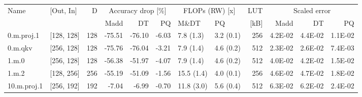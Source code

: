 \begin{table}
\centering
\begin{tabular}{llrrrrllrrrr}
\toprule
Name & [Out, In] & D & \multicolumn{3}{|c|}{Accuracy drop [\%]} & \multicolumn{2}{|c|}{FLOPs (RW) [x]} & LUT & \multicolumn{3}{|c|}{Scaled error} \\
 &  &  & Madd & DT & PQ & M\&DT & PQ & [kB] & Madd & DT & PQ \\
\midrule
0.m.proj.1 & [128, 128] & 128 & {\cellcolor[HTML]{A70226}} \color[HTML]{F1F1F1} -75.51 & {\cellcolor[HTML]{A50026}} \color[HTML]{F1F1F1} -76.10 & {\cellcolor[HTML]{FAFDB8}} \color[HTML]{000000} -6.03 & 7.8 (1.3) & 3.2 (0.1) & 256 & {\cellcolor[HTML]{ECF7A6}} \color[HTML]{000000} 4.2E-02 & {\cellcolor[HTML]{EFF8AA}} \color[HTML]{000000} 4.4E-02 & {\cellcolor[HTML]{BFE47A}} \color[HTML]{000000} 1.1E-02 \\
0.m.qkv & [256, 128] & 128 & {\cellcolor[HTML]{A70226}} \color[HTML]{F1F1F1} -75.76 & {\cellcolor[HTML]{A50026}} \color[HTML]{F1F1F1} -76.04 & {\cellcolor[HTML]{F2FAAE}} \color[HTML]{000000} -3.21 & 7.9 (1.4) & 4.6 (0.2) & 512 & {\cellcolor[HTML]{D3EC87}} \color[HTML]{000000} 2.3E-02 & {\cellcolor[HTML]{D7EE8A}} \color[HTML]{000000} 2.6E-02 & {\cellcolor[HTML]{B9E176}} \color[HTML]{000000} 7.4E-03 \\
1.m.0 & [256, 128] & 128 & {\cellcolor[HTML]{E44C34}} \color[HTML]{F1F1F1} -56.38 & {\cellcolor[HTML]{ED5F3C}} \color[HTML]{F1F1F1} -51.97 & {\cellcolor[HTML]{F5FBB2}} \color[HTML]{000000} -4.07 & 7.9 (1.4) & 4.6 (0.2) & 512 & {\cellcolor[HTML]{EBF7A3}} \color[HTML]{000000} 4.0E-02 & {\cellcolor[HTML]{EEF8A8}} \color[HTML]{000000} 4.2E-02 & {\cellcolor[HTML]{C5E67E}} \color[HTML]{000000} 1.5E-02 \\
1.m.2 & [128, 256] & 256 & {\cellcolor[HTML]{E65036}} \color[HTML]{F1F1F1} -55.19 & {\cellcolor[HTML]{EF633F}} \color[HTML]{F1F1F1} -51.09 & {\cellcolor[HTML]{EEF8A8}} \color[HTML]{000000} -1.56 & 15.5 (1.4) & 4.0 (0.1) & 256 & {\cellcolor[HTML]{F2FAAE}} \color[HTML]{000000} 4.6E-02 & {\cellcolor[HTML]{F4FAB0}} \color[HTML]{000000} 4.7E-02 & {\cellcolor[HTML]{CBE982}} \color[HTML]{000000} 1.8E-02 \\
10.m.proj.1 & [256, 192] & 192 & {\cellcolor[HTML]{FDFEBC}} \color[HTML]{000000} -7.04 & {\cellcolor[HTML]{FDFEBC}} \color[HTML]{000000} -6.99 & {\cellcolor[HTML]{EBF7A3}} \color[HTML]{000000} -0.70 & 11.8 (3.0) & 5.6 (0.4) & 512 & {\cellcolor[HTML]{FFF7B2}} \color[HTML]{000000} 6.3E-02 & {\cellcolor[HTML]{FFF8B4}} \color[HTML]{000000} 6.2E-02 & {\cellcolor[HTML]{D5ED88}} \color[HTML]{000000} 2.4E-02 \\

\end{tabular}
\end{table}
